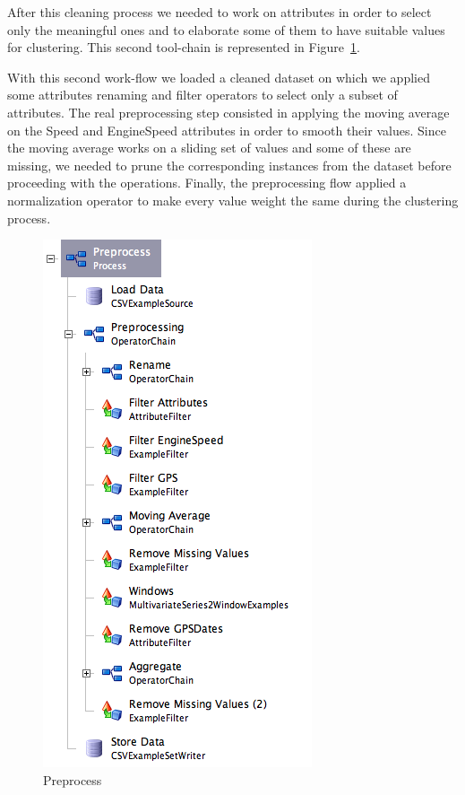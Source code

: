 After this cleaning process we needed to work on attributes in order to select only the meaningful ones and to elaborate some of them to have suitable values for clustering. This second tool-chain is represented in Figure~\ref{figure:preprocess}.



With this second work-flow we loaded a cleaned dataset on which we applied some attributes renaming and filter operators to select only a subset of attributes.
The real preprocessing step consisted in applying the moving average on the Speed and EngineSpeed attributes in order to smooth their values. Since the moving average works on a sliding set of values and some of these are missing, we needed to prune the corresponding instances from the dataset before proceeding with the operations. Finally, the preprocessing flow applied a normalization operator to make every value weight the same during the clustering process.



\begin{figure}[h!]
\centerline{\includegraphics[scale=0.7]{images/preprocess.png}}
\caption{Preprocess}
\label{figure:preprocess}
\end{figure}
